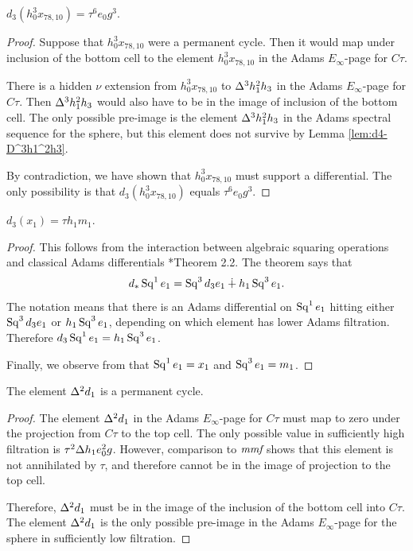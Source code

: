 \begin{lemma}
\label{lem:d3-h0^3x78,10}
$d_3(h_0^3 x_{78,10}) = \tau^6 e_0 g^3$.
\end{lemma}

\begin{proof}
Suppose that $h_0^3 x_{78,10}$ were a permanent cycle.
Then it would map under inclusion of the bottom cell
to the element $h_0^3 x_{78,10}$ in the 
Adams $E_\infty$-page for $C\tau$.

There is a hidden $\nu$ extension from $h_0^3 x_{78,10}$
to $\Delta^3 h_1^2 h_3$ in the Adams $E_\infty$-page for $C\tau$.
Then $\Delta^3 h_1^2 h_3$ would also have to be in the image
of inclusion of the bottom cell.  
The only possible pre-image is the element $\Delta^3 h_1^2 h_3$
in the Adams spectral sequence for the sphere, but this element
does not survive by Lemma \ref{lem:d4-D^3h1^2h3}.

By contradiction, we have shown that $h_0^3 x_{78,10}$
must support a differential.  The only possibility is that
$d_3(h_0^3 x_{78,10})$ equals $\tau^6 e_0 g^3$.
\end{proof}

\begin{lemma}
\label{lem:d3-x1}
$d_3(x_1) = \tau h_1 m_1$.
\end{lemma}

\begin{proof}
This follows from the interaction between algebraic squaring
operations and classical Adams differentials \cite{Bruner84}*{Theorem 2.2}.
The theorem says that
\[
d_* \operatorname{Sq}^1 e_1 = \operatorname{Sq}^3 d_3 e_1 \dotplus h_1 \operatorname{Sq}^3 e_1.
\]
The notation means that there is an Adams differential on $\operatorname{Sq}^1 e_1$
hitting either $\operatorname{Sq}^3 d_3 e_1$ or $h_1 \operatorname{Sq}^3 e_1$,
depending on which element has lower Adams filtration.
Therefore
$d_3 \operatorname{Sq}^1 e_1 = h_1 \operatorname{Sq}^3 e_1$.

Finally, we observe from \cite{Bruner04} that
$\operatorname{Sq}^1 e_1 = x_1$ and $\operatorname{Sq}^3 e_1 = m_1$.
\end{proof}

\begin{lemma}
\label{lem:perm-D^2d1}
The element $\Delta^2 d_1$ is a permanent cycle.
\end{lemma}

\begin{proof}
The element $\Delta^2 d_1$ in the Adams $E_\infty$-page for $C\tau$
must map to zero under the projection from $C\tau$ to the top cell.
The only possible value in sufficiently high filtration is
$\tau^2 \Delta h_1 e_0^2 g$.  However, comparison to $\textit{mmf}$
shows that this element is not annihilated by $\tau$, and therefore
cannot be in the image of projection to the top cell. 

Therefore, $\Delta^2 d_1$ 
must be in the image of the inclusion of the bottom cell into $C\tau$.
The element $\Delta^2 d_1$ is the 
only possible pre-image in the Adams $E_\infty$-page for the sphere 
in sufficiently low filtration.
\end{proof}

